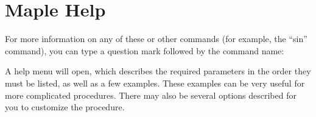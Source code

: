 
\begin{multicols}{3}	
\begin{mapleinput}  \end{mapleinput}
\begin{mapleinput}  \end{mapleinput}
\begin{mapleinput}  \end{mapleinput}

\begin{mapleinput}  \end{mapleinput}
\begin{mapleinput}  \end{mapleinput}
\begin{mapleinput}  \end{mapleinput}
\begin{mapleinput}  \end{mapleinput}

\vfill\null
\end{multicols}

\section{Maple Help}
\label{sec:maple_help}


For more information on any of these or other commands (for example, the ``sin'' command), you can type a question mark followed by the command name: \begin{mapleinput}  \end{mapleinput}  
\noindent A help menu will open, which describes the required parameters in the order they must be listed, as well as a few examples. These examples can be very useful for more complicated procedures. There may also be several options described for you to customize the procedure.

